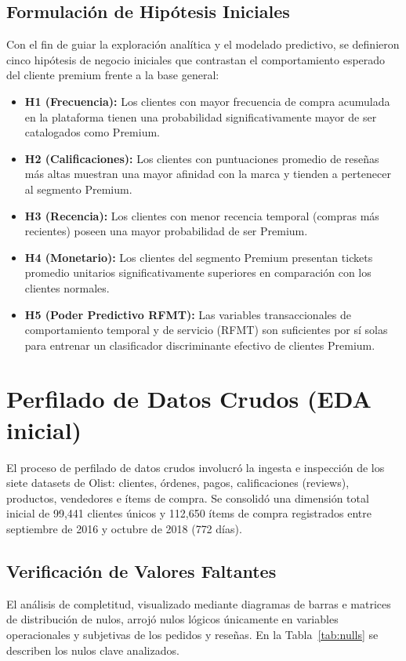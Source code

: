 \documentclass[journal,letterpaper]{IEEEtran}
\begin{document}
\subsection{Formulación de Hipótesis Iniciales}
Con el fin de guiar la exploración analítica y el modelado predictivo, se definieron cinco hipótesis de negocio iniciales que contrastan el comportamiento esperado del cliente premium frente a la base general:
\begin{itemize}
    \item \textbf{H1 (Frecuencia):} Los clientes con mayor frecuencia de compra acumulada en la plataforma tienen una probabilidad significativamente mayor de ser catalogados como Premium.
    \item \textbf{H2 (Calificaciones):} Los clientes con puntuaciones promedio de reseñas más altas muestran una mayor afinidad con la marca y tienden a pertenecer al segmento Premium.
    \item \textbf{H3 (Recencia):} Los clientes con menor recencia temporal (compras más recientes) poseen una mayor probabilidad de ser Premium.
    \item \textbf{H4 (Monetario):} Los clientes del segmento Premium presentan tickets promedio unitarios significativamente superiores en comparación con los clientes normales.
    \item \textbf{H5 (Poder Predictivo RFMT):} Las variables transaccionales de comportamiento temporal y de servicio (RFMT) son suficientes por sí solas para entrenar un clasificador discriminante efectivo de clientes Premium.
\end{itemize}

\section{Perfilado de Datos Crudos (EDA inicial)}
El proceso de perfilado de datos crudos involucró la ingesta e inspección de los siete datasets de Olist: clientes, órdenes, pagos, calificaciones (reviews), productos, vendedores e ítems de compra. Se consolidó una dimensión total inicial de 99,441 clientes únicos y 112,650 ítems de compra registrados entre septiembre de 2016 y octubre de 2018 (772 días).

\subsection{Verificación de Valores Faltantes}
El análisis de completitud, visualizado mediante diagramas de barras e matrices de distribución de nulos, arrojó nulos lógicos únicamente en variables operacionales y subjetivas de los pedidos y reseñas. En la Tabla~\ref{tab:nulls} se describen los nulos clave analizados.
\end{document}
